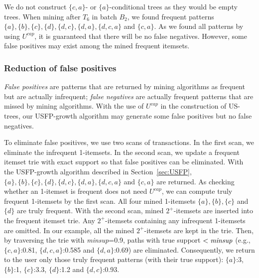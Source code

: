 \documentclass[10pt, conference, compsocconf]{IEEEtran}
\begin{document}
We do not construct $\{c,a\}$- or $\{a\}$-conditional trees as they would be empty trees. When mining after $T_6$ in batch $B_2$, we found frequent patterns $\{a\}, \{b\}, \{c\}, \{d\}, \{d,c\}, \{d,a\}, \{d,c,a\}$ and $\{c, a\}$. As we found all patterns by using $U^{cap}$, it is guaranteed that there will be no false negatives. However, some false positives may exist among the mined frequent itemsets. 

\subsubsection{Reduction of false positives}

{\em False positives} are patterns that are returned by mining algorithms as frequent but are actually infrequent; {\em false negatives} are actually frequent patterns that are missed by mining algorithms.
With the use of $U^{cap}$ in the construction of US-trees, our USFP-growth algorithm may generate some false positives but no false negatives.

To eliminate false positives, we use two scans of transactions. In the first scan, we eliminate the infrequent \mbox{1-itemsets}. In the second scan, we update a frequent itemset trie with exact support so that false positives can be eliminated.
With the USFP-growth algorithm described in Section~\ref{sec:USFP}, $\{a\}, \{b\}, \{c\}, \{d\}, \{d,c\}, \{d,a\}, \{d,c,a\}$ and $\{c, a\}$ are returned. 
As checking whether an 1-itemset is frequent does not need $U^{cap}$, we can compute truly frequent 1-itemsets by the first scan. All four mined 1-itemsets $\{a\}, \{b\}, \{c\}$ and $\{d\}$ are truly frequent. 
With the second scan, mined $2^+$-itemsets are inserted into the frequent itemset trie. Any $2^+$-itemsets containing any infrequent \mbox{1-itemsets} are omitted. In our example, all the mined \mbox{$2^+$-itemsets} are kept in the trie. Then, by traversing the trie with {\it minsup}=0.9, paths with true support $< {\it minsup}$ (e.g., $\{c,a\}$:0.81, $\{d,c,a\}$:0.585 and $\{d,a\}$:0.69) are eliminated. Consequently, we return to the user only those truly frequent patterns (with their true support): $\{a\}$:3, $\{b\}$:1, $\{c\}$:3.3, $\{d\}$:1.2 and $\{d,c\}$:0.93.
\end{document}
